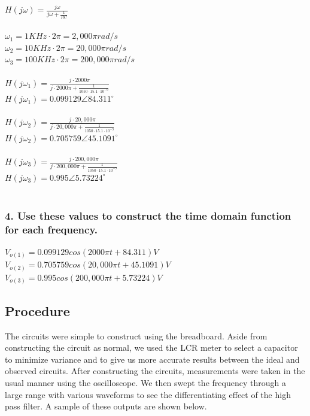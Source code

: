 \documentclass[11pt]{article}
\begin{document}
	$H(j\omega)=\frac{j\omega}{j\omega+\frac{1}{RC}}$\\\\
	$\omega_{1}=1KHz\cdot 2\pi=2,000\pi rad/s$\\
	$\omega_{2}=10KHz\cdot 2\pi=20,000\pi rad/s$\\
	$\omega_{3}=100KHz\cdot 2\pi=200,000\pi rad/s$\\\\
	$H(j\omega_{1})=\frac{j\cdot 2000\pi}{j\cdot 2000\pi+\frac{1}{1050\cdot 15.1 \cdot 10^{-9}}}$\\
	$H(j\omega_{1})=0.099129 \angle84.311^{\circ} $\\\\
	$H(j\omega_{2})=\frac{j\cdot 20,000\pi}{j\cdot 20,000\pi+\frac{1}{1050\cdot 15.1 \cdot 10^{-9}}}$\\
	$H(j\omega_{2})=0.705759 \angle45.1091^{\circ} $\\\\	
	$H(j\omega_{3})=\frac{j\cdot 200,000\pi}{j\cdot 200,000\pi+\frac{1}{1050\cdot 15.1 \cdot 10^{-9}}}$\\
	$H(j\omega_{3})=0.995 \angle5.73224^{\circ} $\\\\
	
	\subsubsection*{4. Use these values to construct the time domain function for each frequency.}
	
	$V_{o(1)}=0.099129cos(2000\pi t+84.311)V$\\
	$V_{o(2)}=0.705759cos(20,000\pi t+45.1091)V$\\
	$V_{o(3)}=0.995cos(200,000\pi t+5.73224)V$\\
	\subsection*{Procedure}
	The circuits were simple to construct using the breadboard. Aside from constructing the circuit as normal, we used the LCR meter to select a capacitor to minimize variance and to give us more accurate results between the ideal and observed circuits. After constructing the circuits, measurements were taken in the usual manner using the oscilloscope. We then swept the frequency through a large range with various waveforms to see the differentiating effect of the high pass filter. A sample of these outputs are shown below.
	
\end{document}
